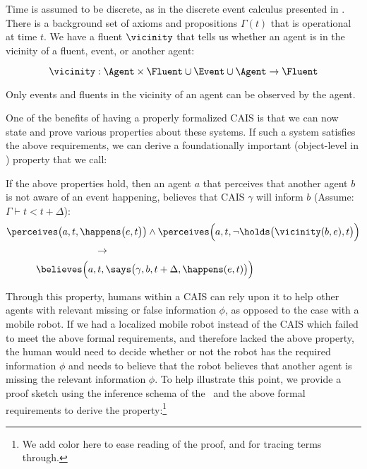 Time is assumed to be discrete, as in the
discrete event calculus presented in \cite{mueller_commonsense_2014}.  There is a
background set of axioms and propositions $\Gamma(t)$ that is
operational at time $t$.  We have a fluent $\vicinity$ that tells us
whether an agent is in the vicinity of a fluent, event, or another
agent:

$$\vicinity: \Agent \times \Fluent \cup \Event \cup \Agent \rightarrow
\Fluent $$

\noindent
Only events and fluents in the vicinity of an agent can be
observed by the agent.


One of the benefits of having a properly formalized CAIS is that we
can now state and prove various properties about these systems. If such
a system satisfies the above requirements, we can derive a foundationally
important (object-level in \CEC) property that we call:

\begin{small}
\begin{mdframed}[linecolor=white, frametitle=Expectation of Usefulness , frametitlebackgroundcolor=gray!25,
  backgroundcolor=gray!10, nobreak=true ,roundcorner=8pt]
  If the above properties hold, then an agent $a$ that perceives that
  another agent $b$ is not aware of an event happening, believes that
  CAIS $\gamma$ will inform $b$ (Assume: $\Gamma \vdash t < t + \Delta$):
\begin{equation*}
\begin{aligned}
&\perceives\big(a, t, \happens\big(e, t\big)\big) \land \perceives\Big(a, t, \lnot \holds\big(\vicinity(b, e),t\big)\Big) \\
& \hspace{90pt} \rightarrow \\
& \hspace{30pt} \believes\Big(a, t, \says\big(\gamma, b, t +\Delta,
\happens(e, t)\big)\Big)\\
\end{aligned}
\end{equation*}
\end{mdframed}
\end{small}

Through this property, humans within a CAIS can rely upon it to help other
agents with relevant missing or false information $\phi$, as opposed to the
case with a mobile robot. If we had a localized mobile robot instead of the
CAIS which failed to meet the above formal requirements, and therefore lacked
the above property, the human would need to decide whether or not the robot has
the required information $\phi$ and needs to believe that the robot believes that
another agent is missing the relevant information $\phi$. To help illustrate this
point, we provide a proof sketch using the inference schema of the \CEC\ and
the above formal requirements to derive the property:\footnote{We add color here
to ease reading of the proof, and for tracing terms through.}

